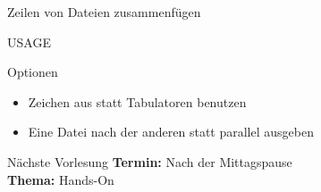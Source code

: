 \documentclass[aspectratio=43]{beamer}
\begin{document}
\begin{frame} 
	\begin{block}{} 
        Zeilen von Dateien zusammenfügen
	\end{block}
	\begin{block}{USAGE} 
	\end{block}
	\begin{exampleblock}{Optionen} 
	\begin{itemize}
	\item {} \newline Zeichen aus  statt Tabulatoren benutzen
	\item {} \newline Eine Datei nach der anderen statt parallel ausgeben
	\end{itemize}
	\end{exampleblock}
\end{frame}


\begin{frame}[plain]
\begin{alertblock}{Nächste Vorlesung}
\textbf{Termin:} Nach der Mittagspause\\
\textbf{Thema:} Hands-On\\
\end{alertblock}
\end{frame}

\materialframe
\versionframe
\end{document}
